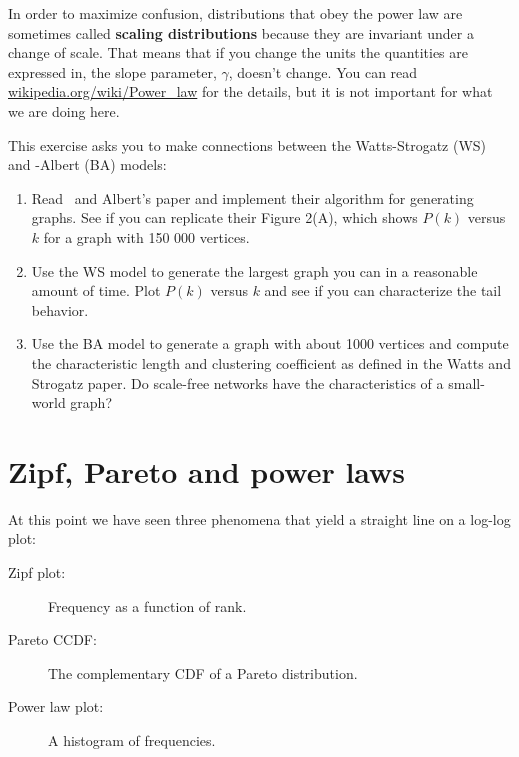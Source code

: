 \documentclass[10pt]{book}
\begin{document}
In order to maximize confusion, distributions that obey the power law
are sometimes called {\bf scaling distributions} because they are
invariant under a change of scale.  That means that if you change the
units the quantities are expressed in, the slope parameter, $\gamma$,
doesn't change.  You can read \url{wikipedia.org/wiki/Power_law} for
the details, but it is not important for what we are doing here.


\begin{exercise}

This exercise asks you to make connections between the Watts-Strogatz (WS)
and \Barabasi-Albert (BA) models:

\begin{enumerate}

\item Read \Barabasi~and Albert's paper and implement their algorithm
for generating graphs.  See if you can replicate their Figure 2(A),
which shows $P(k)$ versus $k$ for a graph with 150 000 vertices.

\item Use the WS model to generate the largest graph you can in
a reasonable amount of time.  Plot $P(k)$ versus $k$ and see if
you can characterize the tail behavior.

\item Use the BA model to generate a graph with about 1000 vertices
and compute the characteristic length and clustering coefficient
as defined in the Watts and Strogatz paper.  Do scale-free networks
have the characteristics of a small-world graph?

\end{enumerate}

\end{exercise}


\section{Zipf, Pareto and power laws}


At this point we have seen three phenomena that yield a straight line
on a log-log plot:

\begin{description}

\item[Zipf plot:] Frequency as a function of rank.

\item[Pareto CCDF:] The complementary CDF of a Pareto distribution.

\item[Power law plot:] A histogram of frequencies.

\end{description}
\end{document}
